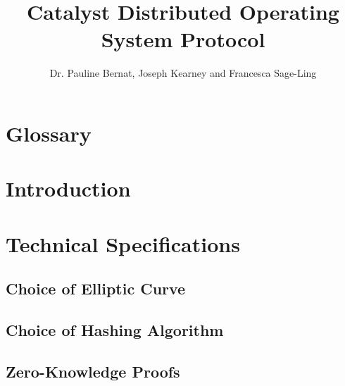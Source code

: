 \documentclass[a4paper, 12pt]{book}
\begin{document}
\parindent=0in

\title{Catalyst Distributed Operating System Protocol}
\author{Dr. Pauline Bernat, Joseph Kearney and Francesca Sage-Ling}
\maketitle 

\tableofcontents



\chapter*{Glossary} \label{Cha:Glo}





\chapter*{Introduction} \label{Cha:Int}
 

 
 
\chapter{Technical Specifications} \label{Cha:Tec}



\section{Choice of Elliptic Curve}\label{Sec:EC}



\section{Choice of Hashing Algorithm}\label{Sec:Has}



\section{Zero-Knowledge Proofs}\label{Sec:ZKP}
\end{document}
